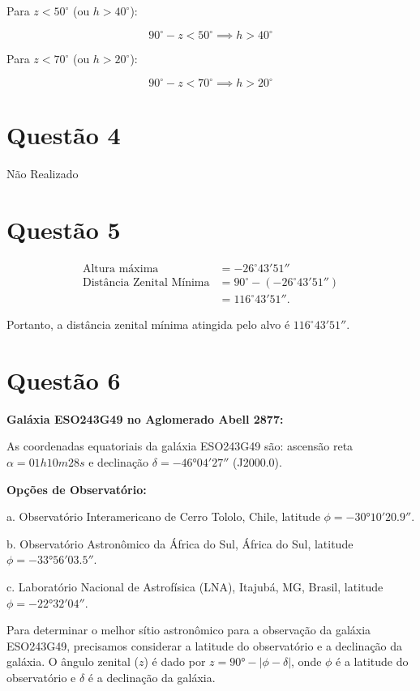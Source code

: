 \documentclass[a4paper, 12pt]{article}
\begin{document}
Para \(z < 50^\circ\) (ou \(h > 40^\circ\)):

\[
90^\circ - z < 50^\circ \implies h > 40^\circ
\]

Para \(z < 70^\circ\) (ou \(h > 20^\circ\)):

\[
90^\circ - z < 70^\circ \implies h > 20^\circ
\]

\section*{Questão 4}
Não Realizado

\section*{Questão 5}

\begin{align*}
\text{Altura máxima} &= -26^\circ 43' 51'' \\
\text{Distância Zenital Mínima} &= 90^\circ - (-26^\circ 43' 51'') \\
&= 116^\circ 43' 51''.
\end{align*}

Portanto, a distância zenital mínima atingida pelo alvo é \(116^\circ 43' 51''\).

\section*{Questão 6}

\textbf{Galáxia ESO243G49 no Aglomerado Abell 2877:}

As coordenadas equatoriais da galáxia ESO243G49 são: ascensão reta \(\alpha = 01h10m28s\) e declinação \(\delta = -46°04'27''\) (J2000.0).

\textbf{Opções de Observatório:}

a. Observatório Interamericano de Cerro Tololo, Chile, latitude \(\phi = -30°10'20.9''\).

b. Observatório Astronômico da África do Sul, África do Sul, latitude \(\phi = -33°56'03.5''\).

c. Laboratório Nacional de Astrofísica (LNA), Itajubá, MG, Brasil, latitude \(\phi = -22°32'04''\).

Para determinar o melhor sítio astronômico para a observação da galáxia ESO243G49, precisamos considerar a latitude do observatório e a declinação da galáxia. O ângulo zenital (\(z\)) é dado por \(z = 90° - |\phi - \delta|\), onde \(\phi\) é a latitude do observatório e \(\delta\) é a declinação da galáxia.
\end{document}
